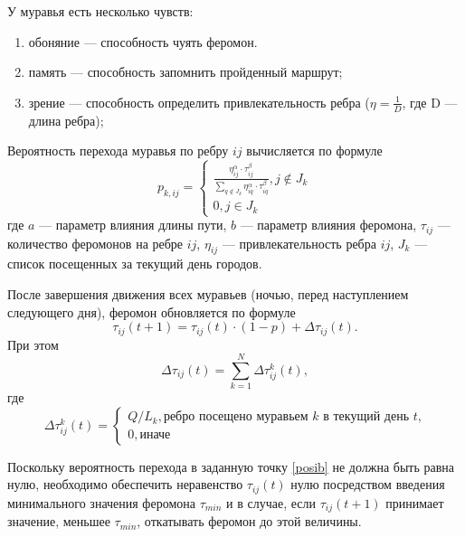 У муравья есть несколько чувств:
\begin{enumerate}[label=\arabic*)]
	\item обоняние --- способность чуять феромон.
	\item память --- способность запомнить пройденный маршрут;
	\item зрение --- способность определить привлекательность ребра ($\eta = \frac{1}{D}$, где D --- длина ребра);
\end{enumerate}

Вероятность перехода муравья по ребру $ij$ вычисляется по формуле
\begin{equation}
	\label{posib}
	p_{k,ij} = \begin{cases}
		\frac{\eta_{ij}^{\alpha}\cdot\tau_{ij}^{\beta}}{\sum_{q\notin J_k} \eta^\alpha_{iq}\cdot\tau^\beta_{iq}}, j \notin J_k \\
		0, j \in J_k
	\end{cases}
\end{equation}
где $a$ --- параметр влияния длины пути, $b$ --- параметр влияния феромона, $\tau_{ij}$ --- количество феромонов на ребре $ij$, $\eta_{ij}$ --- привлекательность ребра $ij$, $J_k$ --- список посещенных за текущий день городов.

После завершения движения всех муравьев (ночью, перед наступлением следующего дня), феромон обновляется по формуле
\begin{equation}
	\tau_{ij}(t+1) = \tau_{ij}(t)\cdot(1-p) + \Delta \tau_{ij}(t).
\end{equation}
При этом
\begin{equation}
	\Delta \tau_{ij}(t) = \sum_{k=1}^N \Delta \tau^k_{ij}(t),
\end{equation}
где
\begin{equation}
	\label{ant_pheromone}
	\Delta\tau^k_{ij}(t) = \begin{cases}
		Q/L_{k}, \textrm{ребро посещено муравьем $k$ в текущий день $t$,} \\
		0, \textrm{иначе}
	\end{cases}
\end{equation}

Поскольку вероятность перехода в заданную точку \ref{posib} не должна быть равна нулю, необходимо обеспечить неравенство $\tau_{ij} (t)$ нулю посредством введения минимального значения феромона $\tau_{min}$ и в случае, если $\tau_{ij} (t+1)$ принимает значение, меньшее $\tau_{min}$, откатывать феромон до этой величины. 

